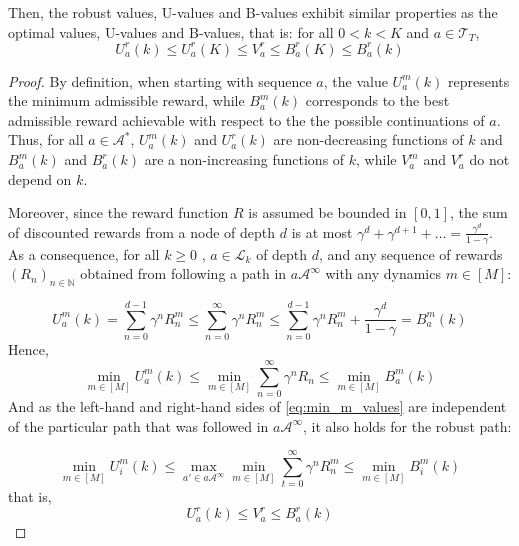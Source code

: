 \begin{subappendices}
\begin{lemma}
		Then, the robust values, U-values and B-values exhibit similar properties as the optimal values, U-values and B-values, that is: for all $0 < k < K$ and $a\in\mathcal{T}_T$,
		\begin{equation}
		U^r_a(k) \leq U^r_a(K) \leq V^r_a \leq B^r_a(K) \leq B^r_a(k)
		\end{equation}
		\label{lemma:uvb}
	\end{lemma}
	\begin{proof}
		By definition, when starting with sequence $a$, the value $U_a^m(k)$ represents the minimum admissible reward, while $B_a^m(k)$ corresponds to the best admissible reward achievable with respect to the the possible continuations of $a$. Thus, for all $a\in\mathcal{A}^*$, $U_a^m(k)$ and $U_a^r(k)$ are non-decreasing functions of $k$ and $B_a^m(k)$ and $B_a^r(k)$ are a non-increasing functions of $k$, while $V_a^m$ and $V_a^r$ do not depend on $k$.
		
		Moreover, since the reward function $R$ is assumed be bounded in $[0, 1]$, the sum of discounted rewards from a node of depth $d$ is at most $\gamma^d + \gamma^{d+1}+\dots = \frac{\gamma^d}{1-\gamma}$. As a consequence, for all $k \geq 0$ , $a\in\mathcal{L}_k$ of depth $d$, and any sequence of rewards $(R_n)_{n\in\mathbb{N}}$ obtained from following a path in $a\mathcal{A}^\infty$ with any dynamics $m \in [M]$:
		
		\begin{equation*}
		U^m_a(k) = \sum_{n=0}^{d-1} \gamma^n R_n^m \leq \sum_{n=0}^\infty \gamma^n R_n^m \leq \sum_{n=0}^{d-1} \gamma^n R_n^m + \frac{\gamma^d}{1-\gamma} = B^m_a(k) 
		\end{equation*}
		Hence,
		\begin{equation}
		\label{eq:min_m_values}
		\min_{m \in [M]} U^m_a(k) \leq \min_{m \in [M]} \sum_{n=0}^\infty \gamma^n R_n \leq \min_{m \in [M]} B^m_a(k)
		\end{equation}
		And as the left-hand and right-hand sides of \eqref{eq:min_m_values} are independent of the particular path that was followed in $a\mathcal{A}^\infty$, it also holds for the robust path:
		
		\begin{equation*}
		\min_{m \in [M]} U^m_i(k) \leq \max_{a'\in a\mathcal{A}^\infty} \min_{m \in [M]} \sum_{t=0}^\infty \gamma^n R_n^m \leq \min_{m \in [M]} B^m_i(k)
		\end{equation*}
		that is,
		\begin{equation}
		\label{eq:urvrbr}
		U^r_a(k) \leq V^r_a  \leq B^r_a(k)
		\end{equation}
		

\end{proof}
\end{subappendices}
